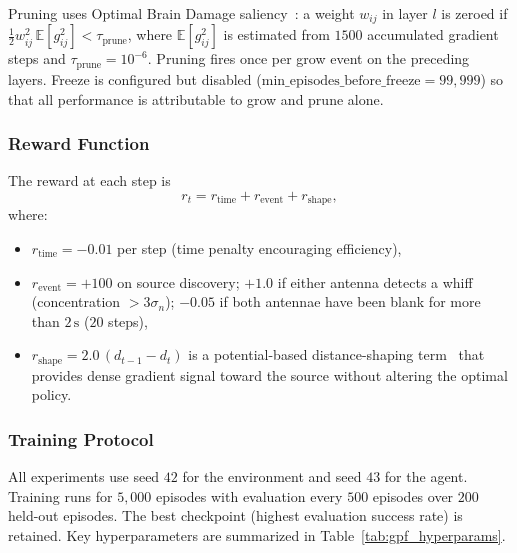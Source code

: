 Pruning uses Optimal Brain Damage
saliency~\cite{lecun1990optimal}: a weight $w_{ij}$ in layer $l$ is zeroed
if $\tfrac{1}{2}w_{ij}^2\,\mathbb{E}[g_{ij}^2] < \tau_{\text{prune}}$,
where $\mathbb{E}[g_{ij}^2]$ is estimated from $1500$ accumulated gradient
steps and $\tau_{\text{prune}} = 10^{-6}$.  Pruning fires once per grow
event on the preceding layers.  Freeze is configured but disabled
($\text{min\_episodes\_before\_freeze} = 99{,}999$) so that all performance
is attributable to grow and prune alone.

\subsubsection{Reward Function}

The reward at each step is
\begin{equation}
  r_t = r_{\text{time}} + r_{\text{event}} + r_{\text{shape}},
\end{equation}
where:
\begin{itemize}
  \item $r_{\text{time}} = -0.01$ per step (time penalty encouraging efficiency),
  \item $r_{\text{event}} = +100$ on source discovery; $+1.0$ if either
    antenna detects a whiff (concentration $> 3\sigma_n$); $-0.05$ if both
    antennae have been blank for more than $2\,\text{s}$ ($20$ steps),
  \item $r_{\text{shape}} = 2.0\,(d_{t-1} - d_t)$ is a potential-based
    distance-shaping term~\cite{ng1999policy} that provides dense gradient
    signal toward the source without altering the optimal policy.
\end{itemize}

\subsubsection{Training Protocol}

All experiments use seed $42$ for the environment and seed $43$ for the
agent.  Training runs for $5{,}000$ episodes with evaluation every $500$
episodes over $200$ held-out episodes.  The best checkpoint (highest
evaluation success rate) is retained.  Key hyperparameters are summarized
in Table~\ref{tab:gpf_hyperparams}.

